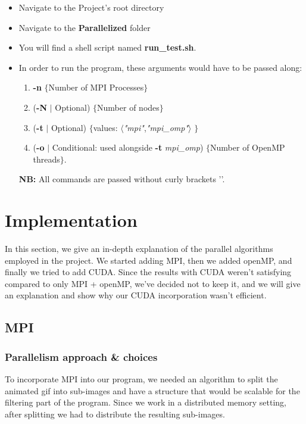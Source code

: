 \documentclass[11pt]{article}
\begin{document}
\begin{itemize}
    \item Navigate to the Project's root directory
    \item Navigate to the \textbf{Parallelized} folder
    \item You will find a shell script named \textbf{run\_test.sh}.
    \item In order to run the program, these arguments would have to be passed along: 
    \begin{enumerate}
        \item \textbf{-n} $\{$Number of MPI Processes$\}$
        \item (\textbf{-N} $|$ Optional) $\{$Number of nodes$\}$
        \item (\textbf{-t} $|$ Optional) $\{$values: $\langle$\textit{"mpi"},\textit{"mpi\_omp"}$\rangle$ $\}$
        \item (\textbf{-o} $|$ Conditional: used alongside \textbf{-t} \textit{mpi\_omp}) $\{$Number of OpenMP threads$\}$.
    \end{enumerate}
    \textbf{NB:} All commands are passed without curly brackets '{}'.
\end{itemize}

\section{Implementation}

In this section, we give an in-depth explanation of the parallel algorithms employed in the project.
We started adding MPI, then we added openMP, and finally we tried to add CUDA. Since the results with CUDA weren't satisfying compared to only MPI + openMP, we've decided not to keep it, and we will give an explanation and show why our CUDA incorporation wasn't efficient.

\subsection{MPI}

\subsubsection{Parallelism approach & choices}
To incorporate MPI into our program, we needed an algorithm to split the animated gif into sub-images and have a structure that would be scalable for the filtering part of the program.
Since we work in a distributed memory setting, after splitting we had to distribute the resulting sub-images.
\end{document}
